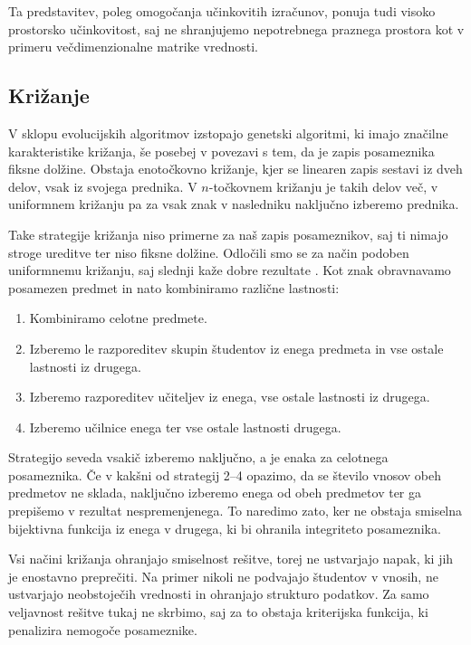 \documentclass[a4paper,12pt]{book}
\begin{document}
\noindent
Ta predstavitev, poleg omogočanja učinkovitih izračunov, ponuja tudi visoko prostorsko učinkovitost, saj ne shranjujemo nepotrebnega praznega prostora kot v primeru večdimenzionalne matrike vrednosti. 


\subsection{Križanje}
V sklopu evolucijskih algoritmov izstopajo genetski algoritmi, ki imajo značil\-ne karakteristike križanja, še posebej v povezavi s tem, da je zapis posameznika fiksne dolžine. Obstaja enotočkovno križanje, kjer se linearen zapis sestavi iz dveh delov, vsak iz svojega prednika. V $n$-točkovnem križanju je takih delov več, v uniformnem križanju pa za vsak znak v nasledniku naključno izberemo prednika. 

Take strategije križanja niso primerne za naš zapis posameznikov, saj ti nimajo stroge ureditve ter niso fiksne dolžine. Odločili smo se za način podoben uniformnemu križanju, saj slednji kaže dobre rezultate \cite{spears1995virtues}. Kot znak obravnavamo posamezen predmet in nato kombiniramo različne lastnosti: 

\begin{enumerate}
\item Kombiniramo celotne predmete. 
\item Izberemo le razporeditev skupin študentov iz enega predmeta in vse ostale lastnosti iz drugega. 
\item Izberemo razporeditev učiteljev iz enega, vse ostale lastnosti iz drugega. 
\item Izberemo učilnice enega ter vse ostale lastnosti drugega. 
\end{enumerate}

Strategijo seveda vsakič izberemo naključno, a je enaka za celotnega posameznika. Če v kakšni od strategij 2--4 opazimo, da se število vnosov obeh predmetov ne sklada, naključno izberemo enega od obeh predmetov ter ga prepišemo v rezultat nespremenjenega. To naredimo zato, ker ne obstaja smiselna bijektivna funkcija iz enega v drugega, ki bi ohranila integriteto posameznika. 

Vsi načini križanja ohranjajo smiselnost rešitve, torej ne ustvarjajo napak, ki jih je enostavno preprečiti. Na primer nikoli ne podvajajo študentov v vnosih, ne ustvarjajo neobstoječih vrednosti in ohranjajo strukturo podatkov. Za samo veljavnost rešitve tukaj ne skrbimo, saj za to obstaja kriterijska funkcija, ki penalizira nemogoče posameznike. 
\end{document}
